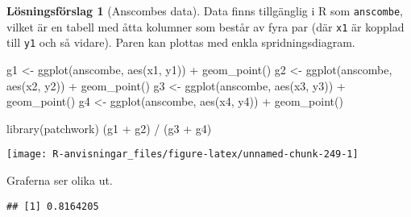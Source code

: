 \documentclass[
]{book}
\newenvironment{Shaded}{\begin{snugshade}}{\end{snugshade}}
\newcommand{\FunctionTok}[1]{\textcolor[rgb]{0.00,0.00,0.00}{#1}}
\newcommand{\NormalTok}[1]{#1}
\newcommand{\OtherTok}[1]{\textcolor[rgb]{0.56,0.35,0.01}{#1}}
\newcommand{\SpecialCharTok}[1]{\textcolor[rgb]{0.00,0.00,0.00}{#1}}
\theoremstyle{definition}
\theoremstyle{definition}
\theoremstyle{definition}
\theoremstyle{definition}
\newtheorem{hypothesis}{Lösningsförslag}[chapter]
\theoremstyle{remark}
\begin{document}
\begin{hypothesis}[Anscombes data]
Data finns tillgänglig i R som \texttt{anscombe}, vilket är en tabell med åtta kolumner som består av fyra par (där \texttt{x1} är kopplad till \texttt{y1} och så vidare). Paren kan plottas med enkla spridningsdiagram.

\begin{Shaded}
\begin{Highlighting}[]
\NormalTok{g1 }\OtherTok{\textless{}{-}} \FunctionTok{ggplot}\NormalTok{(anscombe, }\FunctionTok{aes}\NormalTok{(x1, y1)) }\SpecialCharTok{+} \FunctionTok{geom\_point}\NormalTok{()}
\NormalTok{g2 }\OtherTok{\textless{}{-}} \FunctionTok{ggplot}\NormalTok{(anscombe, }\FunctionTok{aes}\NormalTok{(x2, y2)) }\SpecialCharTok{+} \FunctionTok{geom\_point}\NormalTok{()}
\NormalTok{g3 }\OtherTok{\textless{}{-}} \FunctionTok{ggplot}\NormalTok{(anscombe, }\FunctionTok{aes}\NormalTok{(x3, y3)) }\SpecialCharTok{+} \FunctionTok{geom\_point}\NormalTok{()}
\NormalTok{g4 }\OtherTok{\textless{}{-}} \FunctionTok{ggplot}\NormalTok{(anscombe, }\FunctionTok{aes}\NormalTok{(x4, y4)) }\SpecialCharTok{+} \FunctionTok{geom\_point}\NormalTok{()}

\FunctionTok{library}\NormalTok{(patchwork)}
\NormalTok{(g1 }\SpecialCharTok{+}\NormalTok{ g2) }\SpecialCharTok{/}\NormalTok{ (g3 }\SpecialCharTok{+}\NormalTok{ g4)}
\end{Highlighting}
\end{Shaded}

\begin{center}\texttt{[image: R-anvisningar\_files/figure-latex/unnamed-chunk-249-1]} \end{center}

Graferna ser olika ut.

\begin{Shaded}
\end{Shaded}

\begin{verbatim}
## [1] 0.8164205
\end{verbatim}

\begin{Shaded}
\end{Shaded}


\end{hypothesis}
\end{document}
